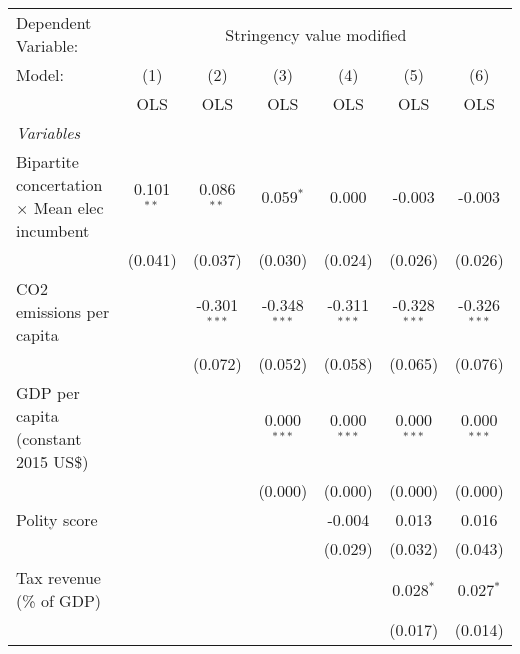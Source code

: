 
\begingroup
\centering
\begin{tabular}{lcccccc}
   \toprule
   Dependent Variable: & \multicolumn{6}{c}{Stringency value modified}\\
   Model:                                               & (1)          & (2)            & (3)            & (4)            & (5)            & (6)\\  
                                                        &  OLS         & OLS            & OLS            & OLS            & OLS            & OLS\\  
   \midrule
   \emph{Variables}\\
   Bipartite concertation $\times$ Mean elec incumbent  & 0.101$^{**}$ & 0.086$^{**}$   & 0.059$^{*}$    & 0.000          & -0.003         & -0.003\\   
                                                        & (0.041)      & (0.037)        & (0.030)        & (0.024)        & (0.026)        & (0.026)\\   
   CO2 emissions per capita                             &              & -0.301$^{***}$ & -0.348$^{***}$ & -0.311$^{***}$ & -0.328$^{***}$ & -0.326$^{***}$\\   
                                                        &              & (0.072)        & (0.052)        & (0.058)        & (0.065)        & (0.076)\\   
   GDP per capita (constant 2015 US\$)                  &              &                & 0.000$^{***}$  & 0.000$^{***}$  & 0.000$^{***}$  & 0.000$^{***}$\\   
                                                        &              &                & (0.000)        & (0.000)        & (0.000)        & (0.000)\\   
   Polity score                                         &              &                &                & -0.004         & 0.013          & 0.016\\   
                                                        &              &                &                & (0.029)        & (0.032)        & (0.043)\\   
   Tax revenue (\% of GDP)                              &              &                &                &                & 0.028$^{*}$    & 0.027$^{*}$\\   
                                                        &              &                &                &                & (0.017)        & (0.014)\\   

\end{tabular}
